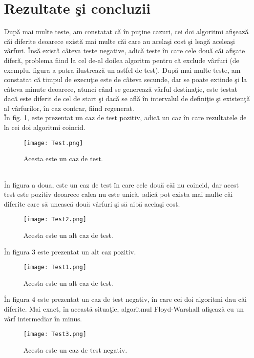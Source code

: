 \documentclass{article}
\begin{document}
\section{Rezultate \c{s}i concluzii}
Dup\u{a} mai multe teste, am constatat c\u{a} \^{i}n pu\c{t}ine cazuri, cei doi algoritmi afi\c{s}eaz\u{a} c\u{a}i diferite deoarece exist\u{a} mai multe c\u{a}i care au acela\c{s}i cost \c{s}i leag\u{a} acelea\c{s}i v\^{a}rfuri. \^{I}ns\u{a} exist\u{a} c\^{a}teva teste negative, adic\u{a} teste \^{i}n care cele dou\u{a} c\u{a}i afi\c{s}ate difer\u{a}, problema fiind la cel de-al doilea algoritm pentru c\u{a} exclude v\^{a}rfuri (de exemplu, figura a patra ilustreaz\u{a} un astfel de test). Dup\u{a} mai multe teste, am constatat c\u{a} timpul de execu\c{t}ie este de c\^{a}teva secunde, dar se poate extinde \c{s}i la c\^{a}teva minute deoarece, atunci c\^{a}nd se genereaz\u{a} v\^{a}rful destina\c{t}ie, este testat dac\u{a} este diferit de cel de start \c{s}i dac\u{a} se afl\u{a} \^{i}n intervalul de defini\c{t}ie \c{s}i existen\c{t}\u{a} al v\^{a}rfurilor, \^{i}n caz contrar, fiind regenerat.\\
\^{I}n fig. 1, este prezentat un caz de test pozitiv, adic\u{a} un caz \^{i}n care rezultatele de la cei doi algoritmi coincid.\\
\begin{figure}[htp]
\centering
\texttt{[image: Test.png]}
\caption{Acesta este un caz de test.}
\label{fig:1}
\end{figure}
\\
\^{I}n figura a doua, este un caz de test \^{i}n care cele dou\u{a} c\u{a}i nu coincid, dar acest test este pozitiv deoarece calea nu este unic\u{a}, adic\u{a} pot exista mai multe c\u{a}i diferite care s\u{a} uneasc\u{a} dou\u{a} v\^{a}rfuri \c{s}i s\u{a} aib\u{a} acela\c{s}i cost.\\
\begin{figure}[htp]
\centering
\texttt{[image: Test2.png]}
\caption{Acesta este un alt caz de test.}
\label{fig:2}
\end{figure}



\^{I}n figura 3 este prezentat un alt caz pozitiv.\\
\begin{figure}[htp]
\centering
\texttt{[image: Test1.png]}
\caption{Acesta este un alt caz de test.}
\label{fig:3}
\end{figure}



\^{I}n figura 4 este prezentat un caz de test negativ, \^{i}n care cei doi algoritmi dau c\u{a}i diferite. Mai exact, \^{i}n aceast\u{a} situa\c{t}ie, algoritmul Floyd-Warshall afi\c{s}eaz\u{a} cu un v\^{a}rf intermediar \^{i}n minus.
\begin{figure}[htp]
\centering
\texttt{[image: Test3.png]}
\caption{Acesta este un caz de test negativ.}
\label{fig:4}
\end{figure}\\
\end{document}
